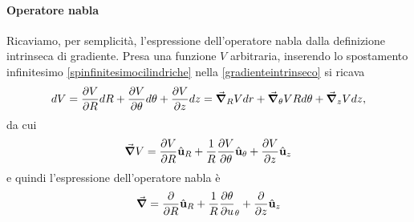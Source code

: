 \paragraph{Operatore nabla}
Ricaviamo, per semplicità, l'espressione dell'operatore nabla dalla definizione intrinseca di gradiente. Presa una funzione $V$ arbitraria, inserendo lo spostamento infinitesimo \ref{spinfinitesimocilindriche} nella \ref{gradienteintrinseco} si ricava
\begin{equation*}
	dV=\pdv{V}{R}dR+\pdv{V}{\theta}d\theta+\pdv{V}{z}dz=\grad_R{V}dr+\grad_\theta{V}Rd\theta+\grad_z{V}dz,
\end{equation*}
da cui
\begin{equation}
	\grad{V}=\pdv{V}{R}\hat{\mathbf{u}}_R+\frac{1}{R}\pdv{V}{\theta}\hat{\mathbf{u}}_\theta+\pdv{V}{z}\hat{\mathbf{u}}_z
\end{equation}
e quindi l'espressione dell'operatore nabla è
\begin{equation}
	\grad =\pdv{R}\hat{\mathbf{u}}_R+\frac{1}{R}\pdv{\theta}{u}_\theta+\pdv{z}\hat{\mathbf{u}}_z
\end{equation}

